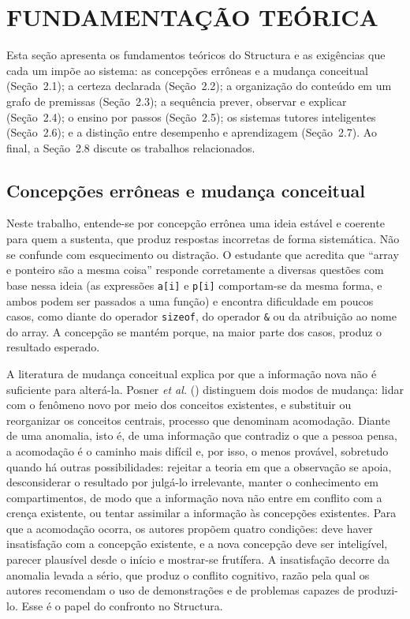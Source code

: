 
\chapter{\texorpdfstring{\mbox{FUNDAMENTAÇÃO} \mbox{TEÓRICA}}{FUNDAMENTAÇÃO TEÓRICA}}\label{cap:2}

Esta seção apresenta os fundamentos teóricos do Structura e as exigências que cada um impõe ao sistema: as concepções errôneas e a mudança conceitual (Seção~2.1); a certeza declarada (Seção~2.2); a organização do conteúdo em um grafo de premissas (Seção~2.3); a sequência prever, observar e explicar (Seção~2.4); o ensino por passos (Seção~2.5); os sistemas tutores inteligentes (Seção~2.6); e a distinção entre desempenho e aprendizagem (Seção~2.7). Ao final, a Seção~2.8 discute os trabalhos relacionados.

\section{Concepções errôneas e mudança conceitual}

Neste trabalho, entende-se por concepção errônea uma ideia estável e coerente para quem a sustenta, que produz respostas incorretas de forma sistemática. Não se confunde com esquecimento ou distração. O estudante que acredita que ``array e ponteiro são a mesma coisa'' responde corretamente a diversas questões com base nessa ideia (as expressões \texttt{a[i]} e \texttt{p[i]} comportam-se da mesma forma, e ambos podem ser passados a uma função) e encontra dificuldade em poucos casos, como diante do operador \texttt{sizeof}, do operador \texttt{\&} ou da atribuição ao nome do array. A concepção se mantém porque, na maior parte dos casos, produz o resultado esperado.

A literatura de mudança conceitual explica por que a informação nova não é suficiente para alterá-la. Posner \textit{et al.} (\citeyear{posner1982}) distinguem dois modos de mudança: lidar com o fenômeno novo por meio dos conceitos existentes, e substituir ou reorganizar os conceitos centrais, processo que denominam acomodação. Diante de uma anomalia, isto é, de uma informação que contradiz o que a pessoa pensa, a acomodação é o caminho mais difícil e, por isso, o menos provável, sobretudo quando há outras possibilidades: rejeitar a teoria em que a observação se apoia, desconsiderar o resultado por julgá-lo irrelevante, manter o conhecimento em compartimentos, de modo que a informação nova não entre em conflito com a crença existente, ou tentar assimilar a informação às concepções existentes. Para que a acomodação ocorra, os autores propõem quatro condições: deve haver insatisfação com a concepção existente, e a nova concepção deve ser inteligível, parecer plausível desde o início e mostrar-se frutífera. A insatisfação decorre da anomalia levada a sério, que produz o conflito cognitivo, razão pela qual os autores recomendam o uso de demonstrações e de problemas capazes de produzi-lo. Esse é o papel do confronto no Structura.

